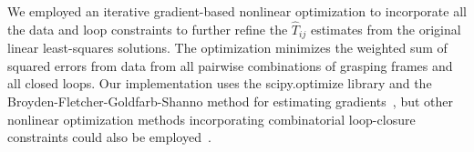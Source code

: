 \documentclass[letterpaper, 10 pt, journal, twoside]{IEEEtran}
\begin{document}
We employed an iterative gradient-based nonlinear optimization to incorporate all the data and loop constraints to further refine the $\hat{T}_{ij}$ estimates from the original linear least-squares solutions. The optimization minimizes the weighted sum of squared errors from data from all pairwise combinations of grasping frames and all closed loops. Our implementation uses the scipy.optimize library and the Broyden-Fletcher-Goldfarb-Shanno method for estimating gradients~\cite{nocedal2006large}, but other nonlinear optimization methods incorporating combinatorial loop-closure constraints could also be employed~\cite{thrun2005probabilistic, lu1997globally}.

\begin{comment}
We implement a loop closure constraint for the rotation matrices and position vectors using the $scipy.optimize$ library with the Broyden–Fletcher–Goldfarb–Shanno (BFGS) method~\cite{nocedal2006large} to ensure global consistency of the solutions. 

To form a rotation matrix loop, the multiplication of each loop requires to equal $I_3$, a $3\times3$ identity matrix. The number of robots has to meet $N\geq3$ for a minimal loop. Let $\mathcal{E}$ be the set of all robot pairs with observed relative rotations $R_{ij}^{\text{obs}}$ derived from~\eqref{eqn:rotation2}, and $\mathcal{L} = \{l_1, l_2, \ldots, l_L\}$ be the set of all loops in the robot network, including sub-loops derived from the general loop. For each loop, $l_k$ is defined by an ordered sequence of robot indices forming a closed path. The optimization problem is structured to minimize the discrepancy between the observed and estimated rotations while ensuring that the product of rotations in each loop equals the identity matrix, reflecting the geometric consistency across the network. The objective function targeting at $R_{ij}$ is defined as follows:
\begin{equation}
\begin{aligned}
    \operatorname{argmin}\limits_{R_{ij}} (\text{J}) = 
    &  w_1 \sum_{(i,j) \in \mathcal{E}}  \left\| R_{ij}^{\text{obs}} - R_{ij} \right\|_F^2 \\
    + & w_2 \sum_{l_k \in \mathcal{L}}\left\| \left ( \prod_{(i,j) \in l_k} R_{ij} \right) - I_{3} \right\|_F^2.
\end{aligned}
\end{equation}

Here, $w_1$ and $w_2$ are weights that balance the emphasis between fitting the observed rotations and ensuring loop closure. To ensure that the optimized result $R_{ij}$ remains elements of SO(3), we enforce constraints by parameterizing the rotation matrices as rotation vectors $r_{ij}$, which serve as input for optimization. During the optimization process, we optimize over the rotation vectors while converting these vectors back into rotation matrices in each iteration to evaluate the cost function $\text{J}$. This approach inherently ensures the SO(3) constraints through iteration, as the exponential map guarantees valid rotations.
\end{comment}
\end{document}

